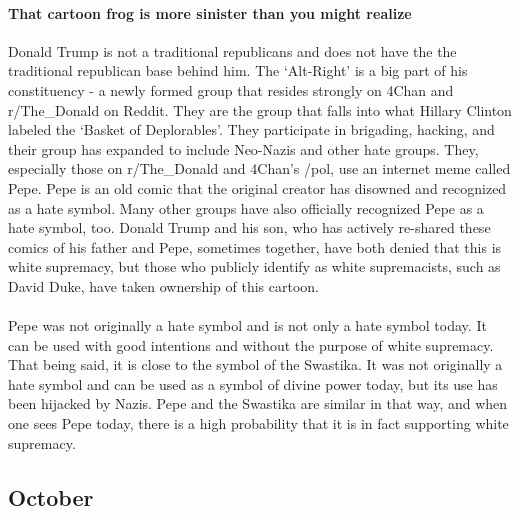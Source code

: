 \documentclass[twoside]{article}
\begin{document}
              \paragraph{That cartoon frog is more sinister than you might realize} Donald Trump is not a traditional republicans and does not have the the traditional republican base behind him. The ‘Alt-Right’ is a big part of his constituency - a newly formed group that resides strongly on 4Chan and r/The\_Donald on Reddit. They are the group that falls into what Hillary Clinton labeled the ‘Basket of Deplorables’. They participate in brigading, hacking, and their group has expanded to include Neo-Nazis and other hate groups. They, especially those on r/The\_Donald and 4Chan’s /pol, use an internet meme called Pepe. Pepe is an old comic that the original creator has disowned and recognized as a hate symbol. Many other groups have also officially recognized Pepe as a hate symbol, too. Donald Trump and his son, who has actively re-shared these comics of his father and Pepe, sometimes together, have both denied that this is white supremacy, but those who publicly identify as white supremacists, such as David Duke, have taken ownership of this cartoon.\\
              \\Pepe was not originally a hate symbol and is not only a hate symbol today. It can be used with good intentions and without the purpose of white supremacy. That being said, it is close to the symbol of the Swastika. It was not originally a hate symbol and can be used as a symbol of divine power today, but its use has been hijacked by Nazis. Pepe and the Swastika are similar in that way, and when one sees Pepe today, there is a high probability that it is in fact supporting white supremacy.
              \newpage
              \subsection{October}
\end{document}
